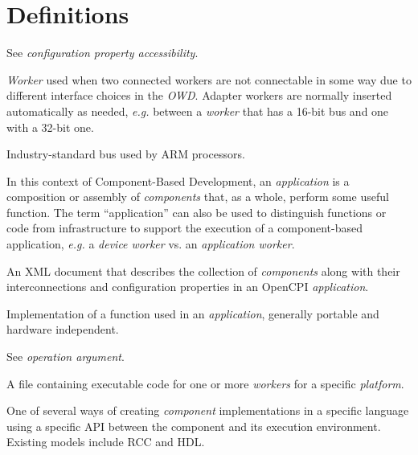 \section{Definitions}
\begin{description}[style=nextline]
\item[Accessibility]
See \textit{configuration property accessibility}.

\item[Adapter Worker]
\textit{Worker} used when two connected workers are not connectable in some way due to different interface choices in the \textit{OWD}.
Adapter workers are normally inserted automatically as needed, \textit{e.g.} between a \textit{worker} that has a 16-bit bus and one with a 32-bit one.

\item[Advanced eXtensible Interface (AXI)]
Industry-standard bus used by ARM processors.

\item[Application]
\subitem[noun] In this context of Component-Based Development, an \textit{application} is a composition or assembly of \textit{components} that, as a whole, perform some useful function.
\subitem[adjective] The term ``application'' can also be used to distinguish functions or code from infrastructure to support the execution of a component-based application, \textit{e.g.} a \textit{device worker} vs. an \textit{application worker}.

\item[Application Specification (OAS)]
An XML document that describes the collection of \textit{components} along with their interconnections and configuration properties in an OpenCPI \textit{application}.

\item[Application Worker]
Implementation of a function used in an \textit{application}, generally portable and hardware independent.

\item[Argument]
See \textit{operation argument}.

\item[Artifact]
A file containing executable code for one or more \textit{workers}  for a specific \textit{platform}.

\item[Authoring Model]
One of several ways of creating \textit{component} implementations in a specific language using a specific API between the component and its execution environment.  Existing models include RCC and HDL. %


\end{description}
